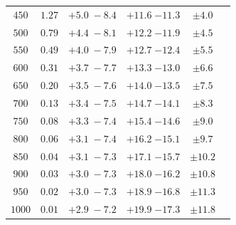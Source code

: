 \begin{table}[!h]
\begin{center}
\begin{tabular}{cccccc}
$450$ & $1.27$  & ${ +5.0 \; -8.4 }$ & ${+11.6}\;{-11.3}$& ${\pm 4.0} $  \\  
$500$ & $0.79$  & ${ +4.4 \; -8.1 }$ & ${+12.2}\;{-11.9}$& ${\pm 4.5} $  \\  
$550$ & $0.49$  & ${ +4.0 \; -7.9 }$ & ${+12.7}\;{-12.4}$& ${\pm 5.5} $  \\  
$600$ & $0.31$  & ${ +3.7 \; -7.7 }$ & ${+13.3}\;{-13.0}$& ${\pm 6.6} $  \\  
$650$ & $0.20$  & ${ +3.5 \; -7.6 }$ & ${+14.0}\;{-13.5}$& ${\pm 7.5} $  \\  
$700$ & $0.13$  & ${ +3.4 \; -7.5 }$ & ${+14.7}\;{-14.1}$& ${\pm 8.3} $  \\  
$750$ & $0.08$  & ${ +3.3 \; -7.4 }$ & ${+15.4}\;{-14.6}$& ${\pm 9.0} $  \\  
$800$ & $0.06$  & ${ +3.1 \; -7.4 }$ & ${+16.2}\;{-15.1}$& ${\pm 9.7} $  \\  
$850$ & $0.04$  & ${ +3.1 \; -7.3 }$ & ${+17.1}\;{-15.7}$& ${\pm 10.2}$  \\  
$900$ & $0.03$  & ${ +3.0 \; -7.3 }$ & ${+18.0}\;{-16.2}$& ${\pm 10.8}$  \\  
$950$ & $0.02$  & ${ +3.0 \; -7.3 }$ & ${+18.9}\;{-16.8}$& ${\pm 11.3}$  \\  
$1000$& $0.01$  & ${ +2.9 \; -7.2 }$ & ${+19.9}\;{-17.3}$& ${\pm 11.8}$  \\ \hline
\end{tabular} 
\end{center} 
\end{table}

